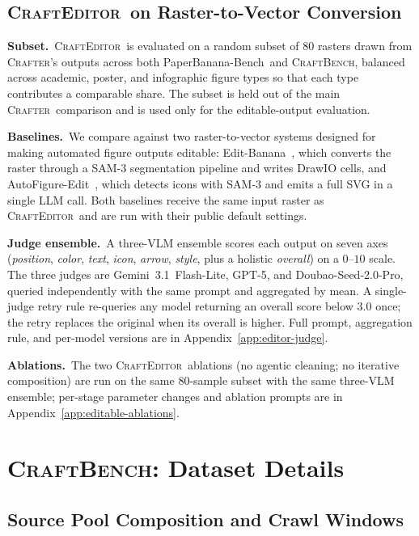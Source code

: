 \documentclass{article}
\newcommand{\Crafter}{\textsc{Crafter}\xspace}
\newcommand{\Editor}{\textsc{CraftEditor}\xspace}
\newcommand{\CrafterBench}{\textsc{CraftBench}\xspace}
\newcommand{\PaperBananaBench}{PaperBanana-Bench\xspace}
\begin{document}
\subsection{\Editor\ on Raster-to-Vector Conversion}
\label{app:setup-editor}

\noindent\textbf{Subset.}\
\Editor\ is evaluated on a random subset of $80$ rasters drawn from \Crafter's outputs across both \PaperBananaBench\ and \CrafterBench, balanced across academic, poster, and infographic figure types so that each type contributes a comparable share. The subset is held out of the main \Crafter\ comparison and is used only for the editable-output evaluation.

\noindent\textbf{Baselines.}\
We compare against two raster-to-vector systems designed for making automated figure outputs editable: Edit-Banana~\citep{editbanana2026}, which converts the raster through a SAM-3 segmentation pipeline and writes DrawIO cells, and AutoFigure-Edit~\citep{lin2026autofigureedit}, which detects icons with SAM-3 and emits a full SVG in a single LLM call. Both baselines receive the same input raster as \Editor\ and are run with their public default settings.

\noindent\textbf{Judge ensemble.}\
A three-VLM ensemble scores each output on seven axes (\textit{position}, \textit{color}, \textit{text}, \textit{icon}, \textit{arrow}, \textit{style}, plus a holistic \textit{overall}) on a $0$--$10$ scale. The three judges are Gemini~3.1~Flash-Lite, GPT-5, and Doubao-Seed-2.0-Pro, queried independently with the same prompt and aggregated by mean. A single-judge retry rule re-queries any model returning an overall score below $3.0$ once; the retry replaces the original when its overall is higher. Full prompt, aggregation rule, and per-model versions are in Appendix~\ref{app:editor-judge}.

\noindent\textbf{Ablations.}\
The two \Editor\ ablations (no agentic cleaning; no iterative composition) are run on the same $80$-sample subset with the same three-VLM ensemble; per-stage parameter changes and ablation prompts are in Appendix~\ref{app:editable-ablations}.



\section{\CrafterBench: Dataset Details}
\label{app:bench-details}

\subsection{Source Pool Composition and Crawl Windows}
\label{sec:bench-sources}
\end{document}
